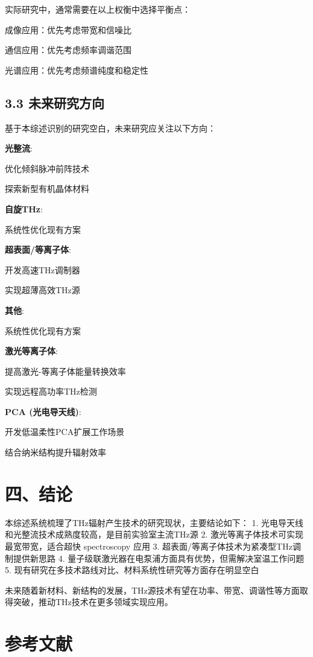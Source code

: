 \documentclass[12pt]{article}
\begin{document}
实际研究中，通常需要在以上权衡中选择平衡点：
\item 成像应用：优先考虑带宽和信噪比
\item 通信应用：优先考虑频率调谐范围
\item 光谱应用：优先考虑频谱纯度和稳定性


\subsection{3.3 未来研究方向}

基于本综述识别的研究空白，未来研究应关注以下方向：

\textbf{光整流}:
\item 优化倾斜脉冲前阵技术
\item 探索新型有机晶体材料

\textbf{自旋THz}:
\item 系统性优化现有方案

\textbf{超表面/等离子体}:
\item 开发高速THz调制器
\item 实现超薄高效THz源

\textbf{其他}:
\item 系统性优化现有方案

\textbf{激光等离子体}:
\item 提高激光-等离子体能量转换效率
\item 实现远程高功率THz检测

\textbf{PCA (光电导天线)}:
\item 开发低温柔性PCA扩展工作场景
\item 结合纳米结构提升辐射效率


\section{四、结论}

本综述系统梳理了THz辐射产生技术的研究现状，主要结论如下：
1. 光电导天线和光整流技术成熟度较高，是目前实验室主流THz源
2. 激光等离子体技术可实现最宽带宽，适合超快 spectroscopy 应用
3. 超表面/等离子体技术为紧凑型THz调制提供新思路
4. 量子级联激光器在电泵浦方面具有优势，但需解决室温工作问题
5. 现有研究在多技术路线对比、材料系统性研究等方面存在明显空白

未来随着新材料、新结构的发展，THz源技术有望在功率、带宽、调谐性等方面取得突破，推动THz技术在更多领域实现应用。

\section{参考文献}
\end{document}
